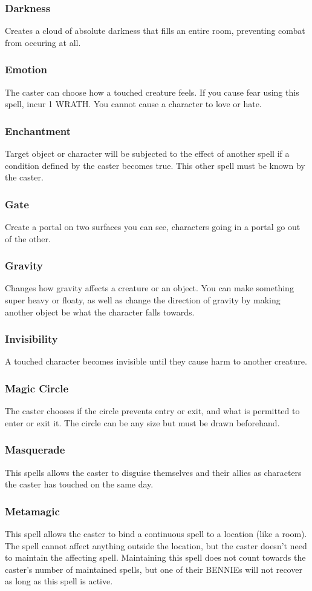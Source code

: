 \begin{multicols}{3}
\subsubsection*{Darkness}
Creates a cloud of absolute darkness that fills an entire room, preventing combat from occuring at all.
\subsubsection*{Emotion}
The caster can choose how a touched creature feels. If you cause fear using this spell, incur 1 WRATH. You cannot cause a character to love or hate.
\subsubsection*{Enchantment}
Target object or character will be subjected to the effect of another spell if a condition defined by the caster becomes true. This other spell must be known by the caster.
\subsubsection*{Gate}
Create a portal on two surfaces you can see, characters going in a portal go out of the other.
\subsubsection*{Gravity}
Changes how gravity affects a creature or an object. You can make something super heavy or floaty, as well as change the direction of gravity by making another object be what the character falls towards.
\subsubsection*{Invisibility}
A touched character becomes invisible until they cause harm to another creature.
\subsubsection*{Magic Circle}
The caster chooses if the circle prevents entry or exit, and what is permitted to enter or exit it. The circle can be any size but must be drawn beforehand.
\subsubsection*{Masquerade}
This spells allows the caster to disguise themselves and their allies as characters the caster has touched on the same day.
\subsubsection*{Metamagic}
This spell allows the caster to bind a continuous spell to a location (like a room). The spell cannot affect anything outside the location, but the caster doesn't need to maintain the affecting spell. Maintaining this spell does not count towards the caster's number of maintained spells, but one of their BENNIEs will not recover as long as this spell is active.

\end{multicols}

